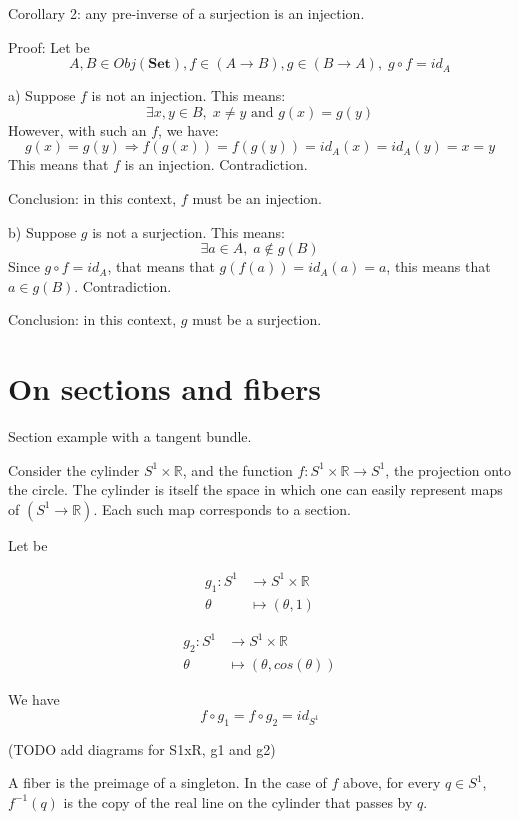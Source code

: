 \documentclass[12pt, letterpaper, twoside]{report}
\begin{document}
Corollary 2: any pre-inverse of a surjection is an injection.

Proof: Let be 
$$A, B \in Obj(\textbf{Set}), f \in (A \to B), g \in (B \to A), \; g \circ f = id_A$$

a) Suppose $f$ is not an injection. This means:
$$\exists x, y \in B, \; x \neq y \text{ and } g(x) = g(y)$$
However, with such an $f$, we have:
$$g(x) = g(y) \Rightarrow f(g(x)) = f(g(y)) = id_A(x) = id_A(y) = x = y$$
This means that $f$ is an injection. Contradiction.

Conclusion: in this context, $f$ must be an injection.

b) Suppose $g$ is not a surjection. This means:
$$\exists a \in A, \; a \notin g(B)$$
Since $g \circ f = id_A$, that means that $g(f(a)) = id_A(a) = a$, this means that $a \in g(B)$. Contradiction.

Conclusion: in this context, $g$ must be a surjection.



\section*{On sections and fibers}

Section example with a tangent bundle.

Consider the cylinder $S^1 \times \mathbb{R}$, and the function $f : S^1 \times \mathbb{R} \to S^1$, the projection onto the circle. The cylinder is itself the space in which one can easily represent maps of $(S^1 \to \mathbb{R})$. Each such map corresponds to a section.

Let be 

$$
\begin{aligned}
g_1 : S^1    & \longrightarrow  S^1 \times \mathbb{R} \\
      \theta & \longmapsto      (\theta, 1)
\end{aligned}
$$


$$
\begin{aligned}
g_2 : S^1    & \longrightarrow  S^1 \times \mathbb{R} \\
      \theta & \longmapsto      (\theta, cos(\theta))
\end{aligned}
$$

We have
$$f \circ g_1 = f \circ g_2 = id_{S^1}$$

(TODO add diagrams for S1xR, g1 and g2)

A fiber is the preimage of a singleton. In the case of $f$ above, for every $q \in S^1$, $f^{-1}({q})$ is the copy of the real line on the cylinder that passes by $q$.
\end{document}
